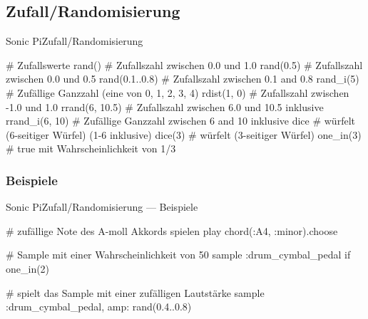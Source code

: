 \documentclass{beamer}
\begin{document}
\begin{frame}
{    \envelopeAttackSustainReleaseExample{}
  }
\end{frame}

\subsection{Zufall/Randomisierung}
\begin{frame}[fragile]{Sonic Pi}{Zufall/Randomisierung}
  \begin{rubycode}

    # Zufallswerte
    rand()          # Zufallszahl zwischen 0.0 und 1.0
    rand(0.5)       # Zufallszahl zwischen 0.0 und 0.5
    rand(0.1..0.8)  # Zufallszahl zwischen 0.1 and 0.8
    rand_i(5)       # Zufällige Ganzzahl (eine von 0, 1, 2, 3, 4)
    rdist(1, 0)     # Zufallszahl zwischen -1.0 und 1.0
    rrand(6, 10.5)  # Zufallszahl zwischen 6.0 und 10.5 inklusive
    rrand_i(6, 10)  # Zufällige Ganzzahl zwischen 6 and 10 inklusive
    dice            # würfelt (6-seitiger Würfel) (1-6 inklusive)
    dice(3)         # würfelt (3-seitiger Würfel)
    one_in(3)       # true mit Wahrscheinlichkeit von 1/3

  \end{rubycode}
\end{frame}

\subsubsection{Beispiele}
\begin{frame}[fragile]{Sonic Pi}{Zufall/Randomisierung --- Beispiele}
  \begin{rubycode}

    # zufällige Note des A-moll Akkords spielen
    play chord(:A4, :minor).choose

    # Sample mit einer Wahrscheinlichkeit von 50%
    sample :drum_cymbal_pedal if one_in(2)

    # spielt das Sample mit einer zufälligen Lautstärke
    sample :drum_cymbal_pedal, amp: rand(0.4..0.8)

  \end{rubycode}
\end{frame}
\end{document}
